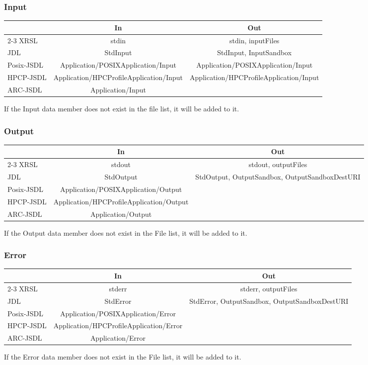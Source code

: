 \documentclass{article}
\newenvironment{inouttabular}%
{\begin{center}\begin{tabular}{l>{\ttfamily\footnotesize}c>{\ttfamily\footnotesize}c}%
\toprule
& \textnormal{\normalsize{In}} & \textnormal{\normalsize{Out}}\\ \cmidrule{2-3}}
{\bottomrule\end{tabular}\end{center}}
\begin{document}
\subsubsection{Input}
\begin{inouttabular}
XRSL & stdin & stdin, inputFiles\\
JDL & StdInput & StdInput, InputSandbox\\
Posix-JSDL & Application/POSIXApplication/Input & Application/POSIXApplication/Input\\
HPCP-JSDL & Application/HPCProfileApplication/Input & Application/HPCProfileApplication/Input\\
ARC-JSDL & Application/Input & \\
\end{inouttabular}
If the Input data member does not exist in the file list, it will be
added to it.

\subsubsection{Output}
\begin{inouttabular}
XRSL & stdout & stdout, outputFiles\\
JDL & StdOutput & StdOutput, OutputSandbox, OutputSandboxDestURI\\
Posix-JSDL & Application/POSIXApplication/Output & \\
HPCP-JSDL & Application/HPCProfileApplication/Output & \\
ARC-JSDL & Application/Output & \\
\end{inouttabular}
If the Output data member does not exist in the File
list, it will be added to it.

\subsubsection{Error}
\begin{inouttabular}
XRSL & stderr & stderr, outputFiles\\
JDL & StdError & StdError, OutputSandbox, OutputSandboxDestURI\\
Posix-JSDL & Application/POSIXApplication/Error &\\
HPCP-JSDL & Application/HPCProfileApplication/Error &\\
ARC-JSDL & Application/Error & \\
\end{inouttabular}
If the Error data member does not exist in the File list, it will be
added to it.
\end{document}

